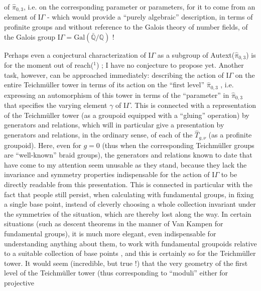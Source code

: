 
of $\hat{\pi}_{0,3}$, i.e. on the corresponding parameter or parameters, for it
to come from an element of $\mathrm{I}\!\Gamma$ - which would provide a
``purely algebraic'' description, in terms of profinite groups and without
reference to the Galois theory of number fields, of the Galois
group $\mathrm{I}\!\Gamma = \mathrm{Gal}(\bar{\mathbb{Q}}/\mathbb{Q})$ !

Perhaps even a conjectural characterization of $\mathrm{I}\!\Gamma$
as a subgroup of Autext($\hat{\pi}_{0,3}$) is for the moment out of
reach($^1$) ; I have no conjecture to propose yet. Another
task, however, can be approached immediately: describing
the action of $\mathrm{I}\!\Gamma$ on the entire Teichmüller tower in terms of its
action on the ``first level'' $\hat{\pi}_{0,3}$ , i.e. expressing an automorphism
of this tower in terms of the ``parameter'' in $\hat{\pi}_{0,3}$ that specifies
the varying element $\gamma$ of $\mathrm{I}\!\Gamma$. This is connected with a representation of the
Teichmüller tower (as a groupoid equipped with a ``gluing''
operation) by generators and relations, which will in particular give
a presentation by generators and relations, in the ordinary sense, of
each of the $\hat{T}_{g,\nu}$ (as a profinite groupoid). Here, even for
$g = 0$ (thus when the corresponding Teichmüller groups are
``well-known'' braid groups), the generators and relations
known to date that have come to my attention seem unusable
as they stand, because they lack the invariance and
symmetry properties indispensable for the action of $\mathrm{I}\!\Gamma$ to be directly
readable from this presentation. This is connected in particular with the fact that
people still persist, when calculating with fundamental
groups, in fixing a single base point, instead of cleverly choosing
a whole collection invariant under the symmetries of the
situation, which are thereby lost along the way. In certain situations
(such as descent theorems in the manner of Van Kampen for fundamental
groups), it is much more elegant, even indispensable for understanding
anything about them, to work with fundamental groupoids
relative to a suitable collection of base points , and this is certainly
so for the Teichmüller tower. It would seem (incredible,
but true !) that the very geometry of the first level of the
Teichmüller tower (thus corresponding to ``moduli'' either for projective


